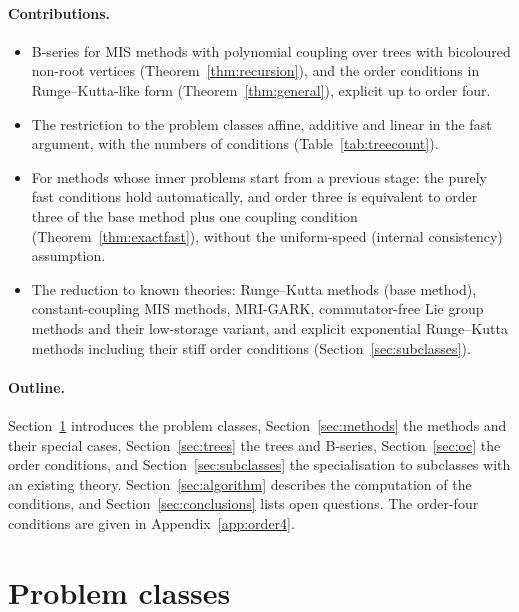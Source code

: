 \documentclass[11pt,a4paper]{article}
\theoremstyle{definition}
\theoremstyle{remark}
\begin{document}
\paragraph{Contributions.}
\begin{itemize}
\item B-series for MIS methods with polynomial coupling over trees with bicoloured non-root vertices
  (Theorem~\ref{thm:recursion}), and the order conditions in Runge--Kutta-like form (Theorem~\ref{thm:general}), explicit
  up to order four.
\item The restriction to the problem classes affine, additive and linear in the fast argument, with the numbers of
  conditions (Table~\ref{tab:treecount}).
\item For methods whose inner problems start from a previous stage: the purely fast conditions hold automatically, and
  order three is equivalent to order three of the base method plus one coupling condition (Theorem~\ref{thm:exactfast}),
  without the uniform-speed (internal consistency) assumption.
\item The reduction to known theories: Runge--Kutta methods (base method), constant-coupling MIS methods, MRI-GARK,
  commutator-free Lie group methods and their low-storage variant, and explicit exponential Runge--Kutta methods
  including their stiff order conditions (Section~\ref{sec:subclasses}).
\end{itemize}

\paragraph{Outline.}
Section~\ref{sec:problem} introduces the problem classes, Section~\ref{sec:methods} the methods and their special cases,
Section~\ref{sec:trees} the trees and B-series, Section~\ref{sec:oc} the order conditions, and
Section~\ref{sec:subclasses} the specialisation to subclasses with an existing theory. Section~\ref{sec:algorithm}
describes the computation of the conditions, and Section~\ref{sec:conclusions} lists open questions. The order-four
conditions are given in Appendix~\ref{app:order4}.

\section{Problem classes}
\label{sec:problem}
\end{document}
